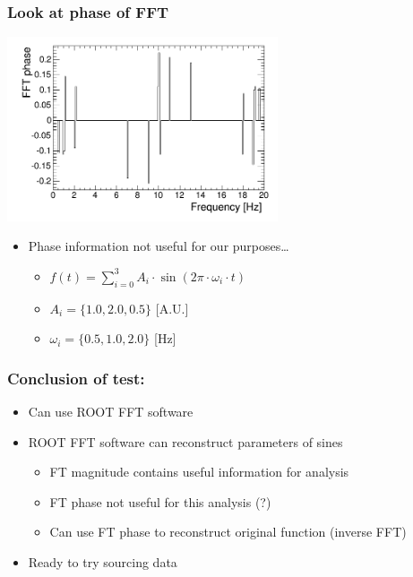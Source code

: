 \documentclass[bigger]{beamer}
\begin{document}
\begin{frame}
\frametitle{Look at phase of FFT}
\label{sec-2-1-4}
\label{sec-2-1-4-1}

\centering
\includegraphics[width=0.6\textwidth]{fig/tutorial_FFT_phase.png}
\begin{itemize}

\item Phase information not useful for our purposes\ldots{}
\label{sec-2-1-4-2}%
\begin{itemize}

\item \(f(t) = \sum_{i = 0}^3 A_{i} \cdot \sin (2\pi \cdot \omega_{i} \cdot t)\)
\label{sec-2-1-4-2-1}%

\item \(A_{i} = \{1.0, 2.0, 0.5\}\) [A.U.]
\label{sec-2-1-4-2-2}%

\item \(\omega_{i} = \{0.5, 1.0, 2.0\}\) [Hz]
\label{sec-2-1-4-2-3}%
\end{itemize} %
\end{itemize} %
\end{frame}
\begin{frame}
\frametitle{Conclusion of test:}
\label{sec-2-1-5}
\begin{itemize}

\item Can use ROOT FFT software
\label{sec-2-1-5-1}%

\item ROOT FFT software can reconstruct parameters of sines
\label{sec-2-1-5-2}%
\begin{itemize}

\item FT magnitude contains useful information for analysis
\label{sec-2-1-5-2-1}%

\item FT phase not useful for this analysis (?)
\label{sec-2-1-5-2-2}%

\item Can use FT phase to reconstruct original function (inverse FFT)
\label{sec-2-1-5-2-3}%
\end{itemize} %

\item Ready to try sourcing data
\label{sec-2-1-5-3}%
\end{itemize} %
\end{frame}
\end{document}
